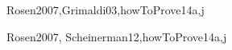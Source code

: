 \begin{syllabus}
\begin{unit}{\DSBasicLogic}{}{Rosen2007,Grimaldi03,howToProve}{14}{a,j}
\begin{topics}
    \item \DSBasicLogicTopicPropositional%
    \item \DSBasicLogicTopicLogical%
    \item \DSBasicLogicTopicTruth%
    \item \DSBasicLogicTopicNormal%
    \item \DSBasicLogicTopicValidity%
    \item \DSBasicLogicTopicPropositionalInference%
    \item \DSBasicLogicTopicPredicate%
    \item \DSBasicLogicTopicLimitations%
\end{topics}
\begin{learningoutcomes}
    \item \DSBasicLogicLOConvertLogical [\Usage ]
    \item \DSBasicLogicLOApplyFormal [\Usage ]
    \item \DSBasicLogicLOUseThe [\Usage]
    \item \DSBasicLogicLODescribeHowCan [\Familiarity]
    \item \DSBasicLogicLOApplyFormalAnd [\Usage ]
    \item \DSBasicLogicLODescribeTheLimitationsAnd [\Usage]
\end{learningoutcomes}
\end{unit}

\begin{unit}{\DSProofTechniques}{}{Rosen2007, Scheinerman12,howToProve}{14}{a,j}
\begin{topics}
    \item \DSProofTechniquesTopicNotions%
    \item \DSProofTechniquesTopicThe%
    \item \DSProofTechniquesTopicDirect%
    \item \DSProofTechniquesTopicDisproving%
    \item \DSProofTechniquesTopicProof%
    \item \DSProofTechniquesTopicInduction%
    \item \DSProofTechniquesTopicStructural%
    \item \DSProofTechniquesTopicWeak%
    \item \DSProofTechniquesTopicRecursive%
    \item \DSProofTechniquesTopicWell%
\end{topics}


\end{unit}
\end{syllabus}
